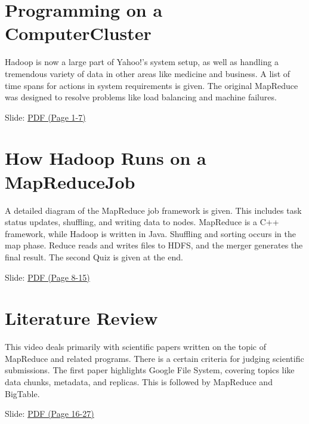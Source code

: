 \section{Programming on a ComputerCluster}

Hadoop is now a large part of Yahoo!'s system setup, as well as handling
a tremendous variety of data in other areas like medicine and business.
A list of time spans for actions in system requirements is given. The
original MapReduce was designed to resolve problems like load balancing
and machine failures.


  Slide:
  \href{https://drive.google.com/open?id=0B88HKpainTSfd3hkTG4yY2FYUVE}{PDF
  (Page 1-7)}

\section{How Hadoop Runs on a MapReduceJob}

A detailed diagram of the MapReduce job framework is given. This
includes task status updates, shuffling, and writing data to nodes.
MapReduce is a C++ framework, while Hadoop is written in Java. Shuffling
and sorting occurs in the map phase. Reduce reads and writes files to
HDFS, and the merger generates the final result. The second Quiz is
given at the end.


  Slide:
  \href{https://drive.google.com/open?id=0B88HKpainTSfd3hkTG4yY2FYUVE}{PDF
  (Page 8-15)}

\section{Literature Review}

This video deals primarily with scientific papers written on the topic
of MapReduce and related programs. There is a certain criteria for
judging scientific submissions. The first paper highlights Google File
System, covering topics like data chunks, metadata, and replicas. This
is followed by MapReduce and BigTable.


  Slide:
  \href{https://drive.google.com/open?id=0B88HKpainTSfd3hkTG4yY2FYUVE}{PDF
  (Page 16-27)}

